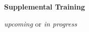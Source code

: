 {\large \textbf{Supplemental Training}}\\

\vspace{-2mm}\begin{center}\footnotesize{ \textit{upcoming} or \textit{in progress}
}\end{center} \vspace{-4mm}
